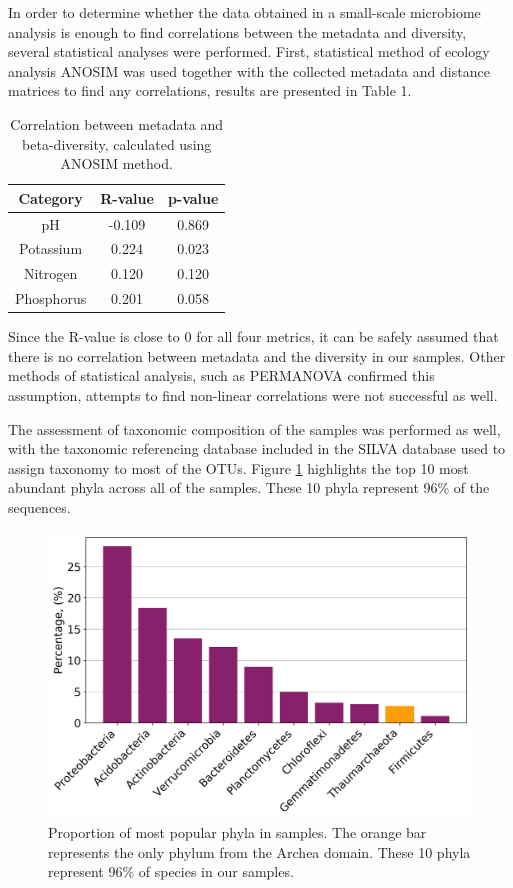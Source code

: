 \documentclass[12pt,twocolumn]{article} %
\begin{document}
\par
In order to determine whether the data obtained in a small-scale microbiome analysis is enough to find correlations between the metadata and diversity, several statistical analyses were performed. First, statistical method of ecology analysis ANOSIM\cite{CLARKE1993} was used together with the collected metadata and distance matrices to find any correlations, results are presented in Table 1.
\begin{table}[ht!] %
	\begin{center}
		\label{tab:table_correlation}
		\begin{tabular}{c|c|c}
			\textbf{Category} & \textbf{R-value} & \textbf{p-value}\\
			\hline
			pH & -0.109 & 0.869\\
			Potassium & 0.224 & 0.023\\
			Nitrogen & 0.120 & 0.120 \\
			Phosphorus & 0.201 & 0.058\\
		\end{tabular}
		\caption{Correlation between metadata and beta-diversity, calculated using ANOSIM\cite{CLARKE1993} method.}
	\end{center}
\end{table}
\par
Since the R-value is close to 0 for all four metrics, it can be safely assumed that there is no correlation between metadata and the diversity in our samples. Other methods of statistical analysis, such as PERMANOVA\cite{Tang2016} confirmed this assumption, attempts to find non-linear correlations were not successful as well.
\par
The assessment of taxonomic composition of the samples was performed as well, with the taxonomic referencing database included in the SILVA database used to assign taxonomy to most of the OTUs. Figure \ref{fig:top_taxa} highlights the top 10 most abundant phyla across all of the samples. These 10 phyla represent 96\% of the sequences.
\begin{figure}[ht!] %
	\includegraphics[width=\linewidth]{top_10.png}
	\caption{Proportion of most popular phyla in samples. The orange bar represents the only phylum from the Archea domain. These 10 phyla represent 96\% of species in our samples.}
	\label{fig:top_taxa}
\end{figure}
\end{document}
